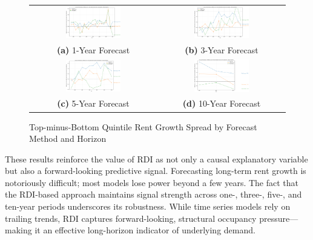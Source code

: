 \documentclass[APA,Times1COL]{WileyNJDv5} %
\begin{document}
\begin{figure}[h!]
	\centering
	\begin{tabular}{cc}
		\includegraphics[width=0.45\textwidth]{spread_comparison_over_time_1yr.pdf} &
		\includegraphics[width=0.45\textwidth]{spread_comparison_over_time_3yr.pdf} \\
		\textbf{(a)} 1-Year Forecast & \textbf{(b)} 3-Year Forecast \\
		\includegraphics[width=0.45\textwidth]{spread_comparison_over_time_5yr.pdf} &
		\includegraphics[width=0.45\textwidth]{spread_comparison_over_time_10yr.pdf} \\
		\textbf{(c)} 5-Year Forecast & \textbf{(d)} 10-Year Forecast \\
	\end{tabular}
	\caption{Top-minus-Bottom Quintile Rent Growth Spread by Forecast Method and Horizon}
	\label{fig:spread-comparison-quadrant}
\end{figure}

These results reinforce the value of RDI as not only a causal explanatory variable but also a forward-looking predictive signal. Forecasting long-term rent growth is notoriously difficult; most models lose power beyond a few years. The fact that the RDI-based approach maintains signal strength across one-, three-, five-, and ten-year periods underscores its robustness. While time series models rely on trailing trends, RDI captures forward-looking, structural occupancy pressure—making it an effective long-horizon indicator of underlying demand.
\end{document}
